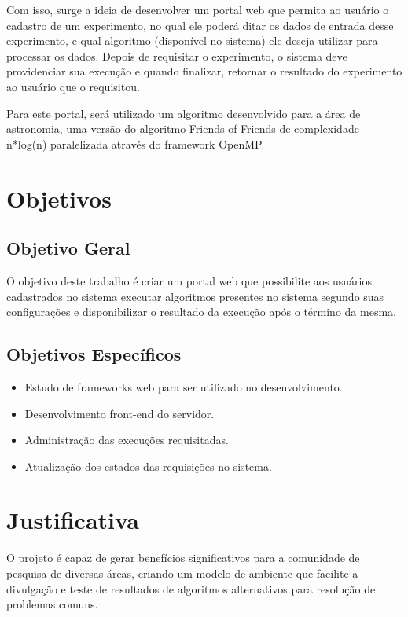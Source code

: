 \documentclass[tg]{mdtufsm}
\begin{document}
Com isso, surge a ideia de desenvolver um portal web que permita ao usuário o cadastro de um experimento, no qual ele poderá ditar os dados de entrada desse experimento, e qual algoritmo (disponível no sistema) ele deseja utilizar para processar os dados. Depois de requisitar o experimento, o sistema deve providenciar sua execução e quando finalizar, retornar o resultado do experimento ao usuário que o requisitou.

Para este portal, será utilizado um algoritmo desenvolvido para a área de astronomia, uma versão do algoritmo Friends-of-Friends de complexidade n*log(n) paralelizada através do framework OpenMP.

\section{Objetivos}

\subsection{Objetivo Geral}

O objetivo deste trabalho é criar um portal web que possibilite aos usuários cadastrados no sistema  executar algoritmos presentes no sistema segundo suas configurações e disponibilizar o resultado da execução após o término da mesma.

\subsection{Objetivos Específicos}
\begin{itemize}
	\item Estudo de frameworks web para ser utilizado no desenvolvimento.
	\item Desenvolvimento front-end do servidor.
	\item Administração das execuções requisitadas.
	\item Atualização dos estados das requisições no sistema.
\end{itemize}

\section{Justificativa}

O projeto é capaz de gerar benefícios significativos para a comunidade de pesquisa de diversas áreas, criando um modelo de ambiente que facilite a divulgação e teste de resultados de algoritmos alternativos para resolução de problemas comuns.
\end{document}
